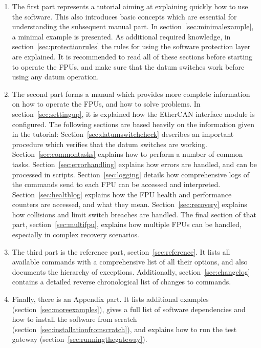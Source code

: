 \documentclass[fontsize=12,a4paper]{scrreprt}
\begin{document}
\begin{enumerate}
\item The first part represents a tutorial aiming at explaining
  quickly how to use the software. This also introduces basic concepts
  which are essential for understanding the subsequent manual part.
  In section~\ref{sec:minimalexample}, a minimal example is
  presented. As additional required knowledge, in
  section~\ref{sec:protectionrules} the rules for using the software
  protection layer are explained. It is recommended to read all of
  these sections before starting to operate the FPUs, and make sure
  that the datum switches work before using any datum operation.

\item The second part forms a manual which provides more complete
  information on how to operate the FPUs, and how to solve
  problems. In section~\ref{sec:settingup}, it is explained how the
  EtherCAN interface module is configured. The following sections are
  based heavily on the information given in the tutorial:
  Section~\ref{sec:datumswitchcheck} describes an important procedure
  which verifies that the datum switches are working.
  Section~\ref{sec:commontasks} explains how to perform a number of
  common tasks. Section~\ref{sec:errorhandling} explains how errors
  are handled, and can be processed in
  scripts. Section~\ref{sec:logging} details how comprehensive logs of
  the commands send to each FPU can be accessed and
  interpreted. Section~\ref{sec:healthlog} explains how the FPU health
  and performance counters are accessed, and what they mean.
  Section~\ref{sec:recovery} explains how collisions and limit switch
  breaches are handled. The final section of that part,
  section~\ref{sec:multifpu}, explains how multiple FPUs can be
  handled, especially in complex recovery scenarios.

\item The third part is the reference part, section~\ref{sec:reference}.
It lists all available commands with a comprehensive list of all their
options, and also documents the hierarchy of exceptions.
Additionally, section~\ref{sec:changelog} contains a detailed reverse
chronological list of changes to commands.

\item Finally, there is an Appendix part. It lists additional examples
  (section~\ref{sec:moreexamples}), gives a full list of software
  dependencies and how to install the software from scratch
  (section~\ref{sec:installationfromscratch}), and explains how to run
  the test gateway (section~\ref{sec:runningthegateway}).
\end{enumerate}
\end{document}
